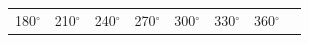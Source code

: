 \begin{center}
\begin{xtabular*}{\mytablewidth}[t]{|p{10\mystarwidth}|p{10\mystarwidth}|p{10\mystarwidth}|p{10\mystarwidth}|p{10\mystarwidth}|p{10\mystarwidth}|p{10\mystarwidth}|p{10\mystarwidth}|}
        180\begin{math}{}^{\circ }\end{math} &
    
    
        210\begin{math}{}^{\circ }\end{math} &
    
    
        240\begin{math}{}^{\circ }\end{math} &
    
    
        270\begin{math}{}^{\circ }\end{math} &
    
    
        300\begin{math}{}^{\circ }\end{math} &
    
    
        330\begin{math}{}^{\circ }\end{math} &
    
    
        360\begin{math}{}^{\circ }\end{math}%
     \tabularnewline{}
    

\end{xtabular*}
\end{center}
